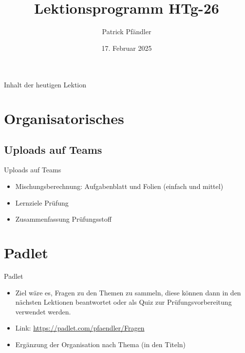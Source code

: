 



\title{\textbf{Lektionsprogramm HTg-26}}
\author{Patrick Pfändler}
\date{17. Februar   2025}




\frame{\titlepage}


\folieFragen



\begin{frame}{Inhalt der heutigen Lektion}
    \tableofcontents
\end{frame}


\section{Organisatorisches}
\BlueSectionSlide

\subsection{Uploads auf Teams}
\begin{frame}{Uploads auf Teams}
    \begin{itemize}
        \item[\textbullet] Mischungsberechnung: Aufgabenblatt und Folien (einfach und mittel)
        \item[\textbullet] Lernziele Prüfung
        \item[\textbullet] Zusammenfassung Prüfungsstoff
    \end{itemize}

\end{frame}




\section{Padlet}
\BlueSectionSlide
\begin{frame}{Padlet}
    \begin{itemize}
        \item[\textbullet] Ziel wäre es, Fragen zu den Themen zu sammeln, diese können dann in den nächsten Lektionen beantwortet oder als Quiz zur Prüfungsvorbereitung verwendet werden.
        \item[\textbullet] Link: \url{https://padlet.com/pfaendler/Fragen}
        \item[\textbullet] Ergänzung der Organisation nach Thema (in den Titeln)
    \end{itemize}
\end{frame}


